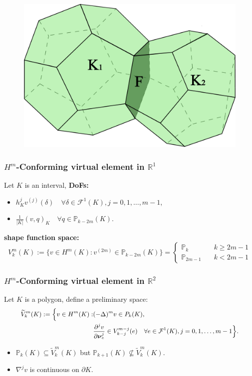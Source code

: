 \documentclass[notheorems,serif]{beamer}
\begin{document}
\begin{CJK}{UTF8}{gkai}
\begin{frame}
  \begin{figure}[H]
    \centering
    \includegraphics[scale=0.2]{../figures/dodecahedron.pdf}
  \end{figure} 
\end{frame}


\begin{frame}
\frametitle{$H^m$-Conforming virtual element in $\mathbb{R}^1$}
Let $K$ is an interval, \bf{DoFs}:
\begin{itemize}
    \item $h_K^j v^{(j)}(\delta) \quad \forall \delta \in \mathcal{F}^1(K),
        j = 0, 1, \dots, m-1$,
    \item $\frac{1}{|K|}(v, q)_K \quad \forall q \in \mathbb{P}_{k-2m}(K)$. 
\end{itemize}
\bf{shape function space}:
$$
V_k^m(K) := \{v \in H^m(K): v^{(2m)}\in\mathbb{P}_{k-2m}(K)\} = 
\left\{ 
\begin{aligned}
    \mathbb{P}_{k} \quad & k\geq 2m-1\\
    \mathbb{P}_{2m-1} \quad & k < 2m-1
\end{aligned}
\right.
$$
\end{frame}

\begin{frame}
\frametitle{$H^m$-Conforming virtual element in $\mathbb{R}^2$}
Let $K$ is a polygon, define a preliminary space:
$$
\small{
\begin{aligned}
  \widetilde{V}_k^m(K) := \Big\{v \in H^m(K) : & (-\Delta)^m v \in P_k(K),\\ 
      & \frac{\partial^j v}{\partial \boldsymbol{\nu}_e^j} \in V_{k-j}^{m-j}(e) \quad 
    \forall e \in \mathcal{F}^1(K), j=0, 1, \dots, m-1\Big\}.
\end{aligned}
}
$$
\begin{itemize}
    \item $\mathbb{P}_k(K) \subseteq \widetilde{V}_k^m(K)$ but 
        $\mathbb{P}_{k+1}(K) \not\subseteq \widetilde{V}_k^m(K)$.
    \item $\nabla^j v$ is continuous on $\partial K$.
\end{itemize}


\end{frame}
\end{CJK}
\end{document}
